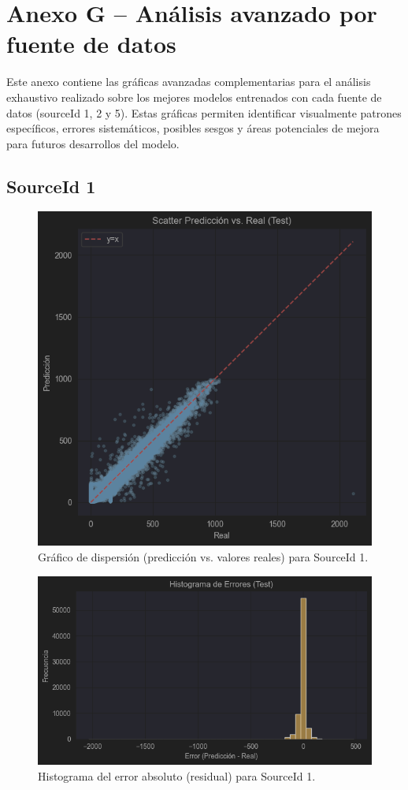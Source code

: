 \section*{Anexo G – Análisis avanzado por fuente de datos}
\label{anexo:analisis_avanzado}

Este anexo contiene las gráficas avanzadas complementarias para el análisis exhaustivo realizado sobre los mejores modelos entrenados con cada fuente de datos (sourceId 1, 2 y 5). Estas gráficas permiten identificar visualmente patrones específicos, errores sistemáticos, posibles sesgos y áreas potenciales de mejora para futuros desarrollos del modelo.

\subsection*{SourceId 1}

\begin{figure}[H]
	\centering
	\includegraphics[width=0.75\linewidth]{includes/cap5/graphs/advanced/sid1_scatter_predicted_vs_actual.png}
	\caption{Gráfico de dispersión (predicción vs. valores reales) para SourceId 1.}
	\label{fig:sid1_scatter}
\end{figure}

\begin{figure}[H]
	\centering
	\includegraphics[width=0.75\linewidth]{includes/cap5/graphs/advanced/sid1_error_histogram_predicted_vs_actual.png}
	\caption{Histograma del error absoluto (residual) para SourceId 1.}
	\label{fig:sid1_histograma_error}
\end{figure}

